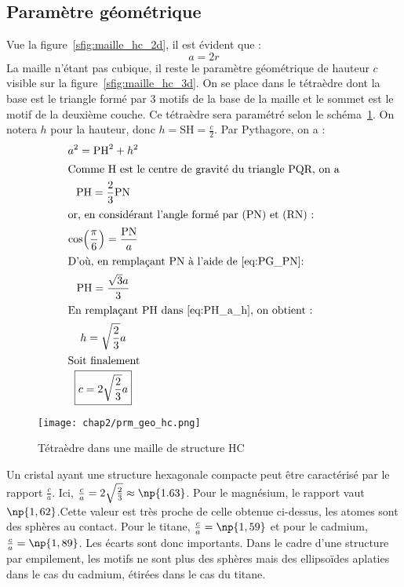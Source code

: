 \subsection{Paramètre géométrique}
Vue la figure~\ref{sfig:maille_hc_2d}, il est évident que :
\begin{equation}
    a = 2r \label{eq;a_r_hc}
\end{equation}
La maille n'étant pas cubique, il reste le paramètre géométrique
de hauteur $c$ visible sur la figure~\ref{sfig:maille_hc_3d}.
On se place dans le tétraèdre dont la base est le triangle formé
par 3 motifs de la base de la maille et le sommet est le motif
de la deuxième couche. Ce tétraèdre sera paramétré selon le
schéma~\ref{fig:prm_geo_hc}.
On notera $h$ pour la hauteur, donc $h = \text{SH} = \frac{c}{2}$.
Par Pythagore, on a :
\begin{gather}
    a^2 = \text{PH}^2 + h^2 \label{eq:PH_a_h}\\
    \intertext{Comme H est le centre de gravité du triangle PQR, on a}
    \text{PH} = \frac{2}{3}\text{PN}\label{eq:PG_PN}\\
    \intertext{or, en considérant l'angle formé par (PN) et (RN) :}
    \cos\Bigl( \frac{\pi}{6}\Bigr) = \frac{\text{PN}}{a}\\
    \intertext{D'où, en remplaçant PN à l'aide de~\ref{eq:PG_PN}:}
    \text{PH} = \frac{\sqrt{3}a}{3}\label{eq:PH_a}\\
    \intertext{En remplaçant PH dans~\ref{eq:PH_a_h}, on obtient :}
    h = \sqrt{\frac{2}{3}}a\\
    \intertext{Soit finalement}
    \boxed{c=2\sqrt{\frac{2}{3}}a} \label{eq:c_hc}
\end{gather}
\begin{figure}
    \centering
    \texttt{[image: chap2/prm\_geo\_hc.png]}
    \caption{Tétraèdre dans une maille
        de structure HC}\label{fig:prm_geo_hc}
\end{figure}
\begin{rem}
    Un cristal ayant une structure hexagonale compacte
    peut être caractérisé par le rapport $\frac{c}{a}$.
    Ici, $\frac{c}{a} = 2\sqrt{\frac{2}{3}}\approx \np{1.63}$.
    Pour le magnésium, le rapport vaut
    $\np{1,62}$.Cette valeur est très proche de celle
    obtenue ci-dessus, les atomes sont des sphères
    au contact. Pour le titane,
    $\frac{c}{a}=\np{1,59}$ et pour le cadmium,
    $\frac{c}{a}=\np{1,89}$. Les écarts sont donc
    importants. Dans le cadre d’une structure par empilement,
    les motifs ne sont plus des sphères mais des ellipsoïdes
    aplaties dans le cas du cadmium, étirées dans le cas du titane.
\end{rem}

